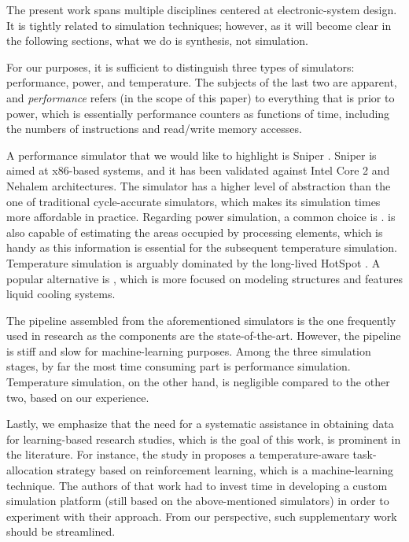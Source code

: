 The present work spans multiple disciplines centered at electronic-system
design. It is tightly related to simulation techniques; however, as it will
become clear in the following sections, what we do is synthesis, not simulation.

For our purposes, it is sufficient to distinguish three types of simulators:
performance, power, and temperature. The subjects of the last two are apparent,
and \emph{performance} refers (in the scope of this paper) to everything that is
prior to power, which is essentially performance counters as functions of time,
including the numbers of instructions and read/write memory accesses.

A performance simulator that we would like to highlight is Sniper
\cite{carlson2011}. Sniper is aimed at x86-based systems, and it has been
validated against Intel Core 2 and Nehalem architectures. The simulator has a
higher level of abstraction than the one of traditional cycle-accurate
simulators, which makes its simulation times more affordable in practice.
Regarding power simulation, a common choice is  \cite{li2009}.
 is also capable of estimating the areas occupied by processing
elements, which is handy as this information is essential for the subsequent
temperature simulation. Temperature simulation is arguably dominated by the
long-lived HotSpot \cite{skadron2004}. A popular alternative is 
\cite{sridhar2010}, which is more focused on modeling  structures and
features liquid cooling systems.

The pipeline assembled from the aforementioned simulators is the one frequently
used in research as the components are the state-of-the-art. However, the
pipeline is stiff and slow for machine-learning purposes. Among the three
simulation stages, by far the most time consuming part is performance
simulation. Temperature simulation, on the other hand, is negligible compared to
the other two, based on our experience.

Lastly, we emphasize that the need for a systematic assistance in obtaining data
for learning-based research studies, which is the goal of this work, is
prominent in the literature. For instance, the study in \cite{lu2015} proposes a
temperature-aware task-allocation strategy based on reinforcement learning,
which is a machine-learning technique. The authors of that work had to invest
time in developing a custom simulation platform (still based on the
above-mentioned simulators) in order to experiment with their approach. From our
perspective, such supplementary work should be streamlined.
